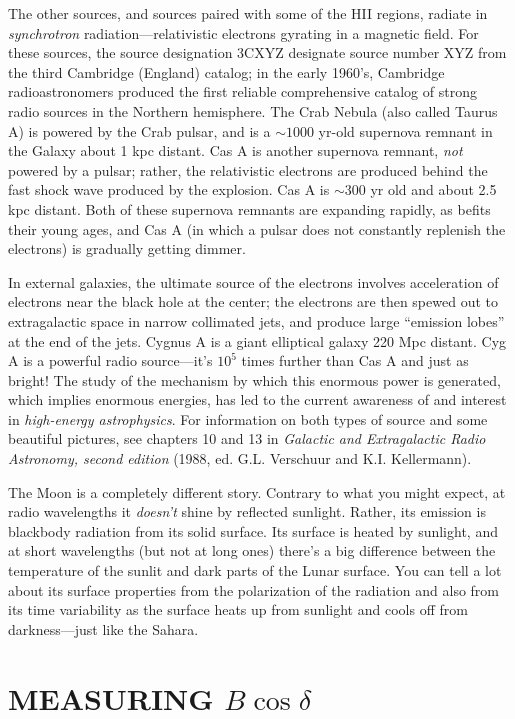 \documentclass[11pt,preprint]{aastex}
\begin{document}
The other sources, and sources paired with some of the HII regions,
radiate in {\it synchrotron} radiation---relativistic electrons gyrating
in a magnetic field.  For these sources, the source designation 3CXYZ
designate source number XYZ from the third Cambridge (England) catalog;
in the early 1960's, Cambridge radioastronomers produced the first
reliable comprehensive catalog of strong radio sources in the Northern
hemisphere.  The Crab Nebula (also called Taurus A) is powered by the
Crab pulsar, and is a $\sim 1000$ yr-old supernova remnant in the Galaxy
about 1 kpc distant. Cas A is another supernova remnant, {\it not}
powered by a pulsar; rather, the relativistic electrons are produced
behind the fast shock wave produced by the explosion.  Cas A is $\sim
300$ yr old and about 2.5 kpc distant.  Both of these supernova remnants
are expanding rapidly, as befits their young ages, and Cas A (in which a
pulsar does not constantly replenish the electrons) is gradually getting
dimmer.

In external galaxies, the ultimate source of the
electrons involves acceleration of electrons near the black hole at the
center; the electrons are then spewed out to extragalactic space in
narrow collimated jets, and produce large ``emission lobes'' at the end
of the jets.  Cygnus A is a giant
elliptical galaxy 220 Mpc distant.  Cyg A is a powerful radio
source---it's $10^5$ times further than Cas A and just as bright! The
study of the mechanism by which this enormous power is generated, which
implies enormous energies, has led to the current awareness of and
interest in {\it high-energy astrophysics}.
For information on both types of source and some beautiful
pictures, see chapters 10 and 13 in {\it Galactic and Extragalactic
Radio Astronomy, second edition} (1988, ed.  G.L.  Verschuur and K.I. 
Kellermann). 

	The Moon is a completely different story. Contrary to what you
might expect, at radio wavelengths it {\it doesn't} shine by reflected
sunlight. Rather, its emission is blackbody radiation from its solid
surface. Its surface is heated by sunlight, and at short wavelengths
(but not at long ones) there's a big difference between the temperature
of the sunlit and dark parts of the Lunar surface. You can tell a lot
about its surface properties from the polarization of the radiation and
also from its time variability as the surface heats up from sunlight and
cools off from darkness---just like the Sahara.

\section {MEASURING $B \cos \delta$} \label{declinations}
\end{document}
